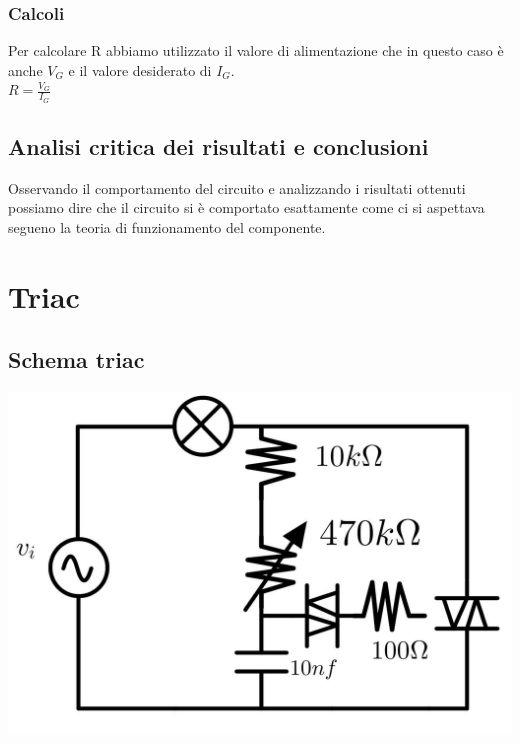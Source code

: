 \documentclass[12pt]{article}
\begin{document}
        \subsubsection{Calcoli}
        Per calcolare R abbiamo utilizzato il valore di alimentazione che in questo caso è anche $V_G$ e il valore desiderato di $I_G$.\\
        $R=\frac{V_G}{I_G}$
    \subsection{Analisi critica dei risultati e conclusioni}
    Osservando il comportamento del circuito e analizzando i risultati ottenuti possiamo dire che il circuito si è comportato esattamente come ci si aspettava segueno la teoria di funzionamento del componente.\\
\section{Triac}
\subsection{Schema triac}
    \includegraphics[scale=0.2]{schema-triac}
\end{document}
